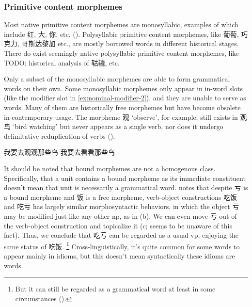 \documentclass[UTF8, a4paper, oneside, scheme=plain, 12pt]{ctexrep}
\newcommand*{\citesec}[1]{\S~{#1}}
\newcommand{\translate}[1]{`#1'}
\begin{document}
\subsubsection{Primitive content morphemes}\label{sec:pos.morpheme.primitive}

Most native primitive content morphemes 
are monosyllabic, examples of which include 红, 大, 你, etc.
().
Polysyllabic primitive content morphemes,
like 葡萄, 巧克力, 哥斯达黎加 etc., 
are mostly borrowed words
in different historical stages.
There do exist seemingly native polysyllabic primitive content morphemes,
like TODO: historical analysis of 轱辘, etc.

Only a subset of the monosyllabic morphemes are able to form grammatical words
on their own.
Some monosyllabic morphemes only appear in in-word slots 
(like the modifier slot in \eqref{ex:nominal-modifier-2}),
and they are unable to serve as words.
Many of them are historically free morphemes
but have become obsolete in contemporary usage.
The morpheme 观 \translate{observe}, for example,
still exists in 观鸟 \translate{bird watching}
but never appears as a single verb, 
nor does it undergo delimitative reduplication of verbs
().

\begin{exe}
    \ex\label{ex:pos.obsolete-1} \begin{xlist}
        \ex *我要去观观那些鸟
        \ex 我要去看看那些鸟
    \end{xlist}
\end{exe}

It should be noted that bound morphemes are not a homogenous class.
Specifically, that a unit contains a bound morpheme as its immediate constituent
doesn't mean that unit is necessarily a grammatical word.
\citet[\citesec{8.3.2}]{zhudexigrammar} notes that 
despite 亏 is a bound morpheme and 饭 is a free morpheme,
verb-object constructions 吃饭 and 吃亏 has largely similar morphosyntactic behaviors,
in which the object 亏 may be modified just like any other \acs{np}, 
as in (b).
We can even move 亏 out of the verb-object construction 
and topicalize it (c; 
\citet{zhudexigrammar} seems to be unaware of this fact).
Thus, we conclude that 吃亏 can be regarded 
as a usual \acs{vp},
enjoying the same status of 吃饭.%
\footnote{
    But it can still be regarded as a grammatical word
    at least in some circumstances
    ().
}
Cross-linguistically, 
it's quite common for some words to appear mainly in idioms, 
but this doesn't mean syntactically
these idioms are words.
\end{document}
